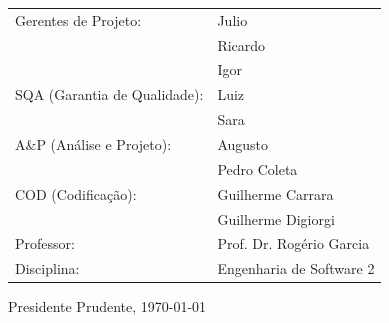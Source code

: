 \vspace{2cm}

\begin{table}[H]
    \begin{tabular}{ll}
        Gerentes de Projeto: & Julio\\
                           & Ricardo\\
                           & Igor\\[1cm]
        SQA (Garantia de Qualidade): & Luiz\\
                                    & Sara\\[0.5cm]
        A\&P (Análise e Projeto): & Augusto\\
                                 & Pedro Coleta\\[0.5cm]
        COD (Codificação): & Guilherme Carrara\\
                          & Guilherme Digiorgi\\[1cm]
        Professor: & Prof. Dr. Rogério Garcia\\[1cm]
        Disciplina: & Engenharia de Software 2\\
    \end{tabular}
\end{table}

\vspace*{\fill}

\begin{center}
    Presidente Prudente, \today
\end{center}

\newpage
